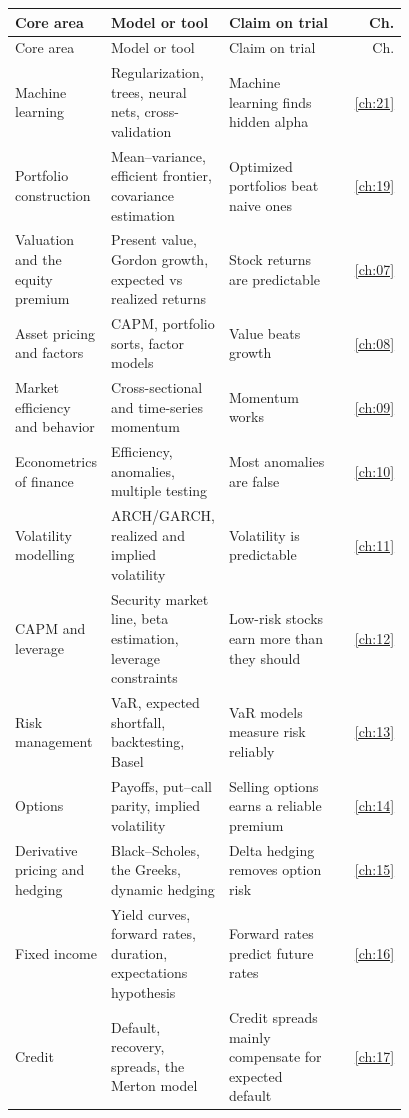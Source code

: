 \begingroup
\small
\setlength{\LTpre}{6pt}\setlength{\LTpost}{6pt}
\begin{longtable}{@{}>{\raggedright\arraybackslash}p{0.198\linewidth}>{\raggedright\arraybackslash}p{0.288\linewidth}>{\raggedright\arraybackslash}p{0.297\linewidth}r@{}}
\toprule
Core area & Model or tool & Claim on trial & Ch. \\
\midrule
\endfirsthead
\toprule
Core area & Model or tool & Claim on trial & Ch. \\
\midrule
\endhead
\bottomrule
\endlastfoot
Machine learning & Regularization, trees, neural nets, cross-validation & Machine learning finds hidden alpha & \ref{ch:21} \\
Portfolio construction & Mean--variance, efficient frontier, covariance estimation & Optimized portfolios beat naive ones & \ref{ch:19} \\
Valuation and the equity premium & Present value, Gordon growth, expected vs realized returns & Stock returns are predictable & \ref{ch:07} \\
Asset pricing and factors & CAPM, portfolio sorts, factor models & Value beats growth & \ref{ch:08} \\
Market efficiency and behavior & Cross-sectional and time-series momentum & Momentum works & \ref{ch:09} \\
Econometrics of finance & Efficiency, anomalies, multiple testing & Most anomalies are false & \ref{ch:10} \\
Volatility modelling & ARCH/GARCH, realized and implied volatility & Volatility is predictable & \ref{ch:11} \\
CAPM and leverage & Security market line, beta estimation, leverage constraints & Low-risk stocks earn more than they should & \ref{ch:12} \\
Risk management & VaR, expected shortfall, backtesting, Basel & VaR models measure risk reliably & \ref{ch:13} \\
Options & Payoffs, put--call parity, implied volatility & Selling options earns a reliable premium & \ref{ch:14} \\
Derivative pricing and hedging & Black--Scholes, the Greeks, dynamic hedging & Delta hedging removes option risk & \ref{ch:15} \\
Fixed income & Yield curves, forward rates, duration, expectations hypothesis & Forward rates predict future rates & \ref{ch:16} \\
Credit & Default, recovery, spreads, the Merton model & Credit spreads mainly compensate for expected default & \ref{ch:17} \\

\end{longtable}
